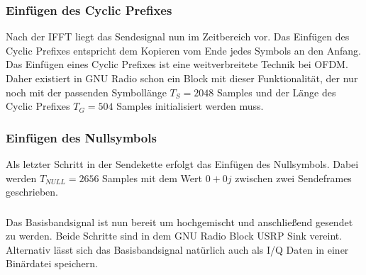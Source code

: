 \subsubsection{Einfügen des Cyclic Prefixes}
Nach der IFFT liegt das Sendesignal nun im Zeitbereich vor. Das Einfügen des Cyclic Prefixes entspricht dem Kopieren vom Ende jedes Symbols an den Anfang. Das Einfügen eines Cyclic Prefixes ist eine weitverbreitete Technik bei OFDM. Daher existiert in GNU Radio schon ein Block mit dieser Funktionalität, der nur noch mit der passenden Symbollänge $T_S = 2048$ Samples und der Länge des Cyclic Prefixes $T_G = 504$ Samples initialisiert werden muss.

\subsubsection{Einfügen des Nullsymbols}
Als letzter Schritt in der Sendekette erfolgt das Einfügen des Nullsymbols. Dabei werden $T_{NULL}=2656$ Samples mit dem Wert $0+0j$ zwischen zwei Sendeframes geschrieben.

\subsubsection{}
Das Basisbandsignal ist nun bereit um hochgemischt und anschließend gesendet zu werden. Beide Schritte sind in dem GNU Radio Block USRP Sink vereint. Alternativ lässt sich das Basisbandsignal natürlich auch als I/Q Daten in einer Binärdatei speichern.